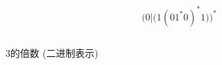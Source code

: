 
\begin{frame}{}
  \[
    \Big(0|\big(1(01^{\ast}0)^{\ast}1\big)\Big)^{\ast}
  \]

  \begin{center}
  \end{center}
\end{frame}

\begin{frame}{}
  \begin{columns}
      \pause
      \begin{center}
        3的倍数 (二进制表示)
      \end{center}
  \end{columns}
\end{frame}

